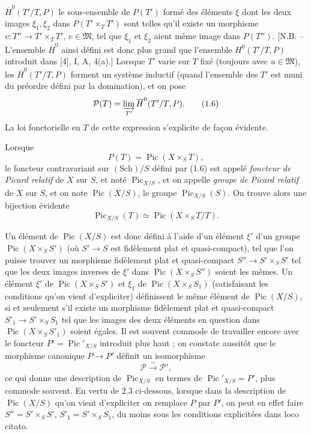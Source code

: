 $\overline H^0(T'/T,P)$ le sous-ensemble de $P(T')$ formé des éléments $\xi$
dont les deux images $\xi_1,\xi_2$ dans $P(T'\times_TT')$ sont telles qu'il
existe un morphisme $v:T''\longrightarrow T'\times_TT'$, $v\in\mathfrak M$,
tel que $\xi_1$ et $\xi_2$ aient même image dans $P(T'')$. [N.B. -- L'ensemble
$\overline H^0$ ainsi défini est donc plus grand que l'ensemble
$H^0(T'/T,P)$ introduit dans [4], I, A, 4(a).] Lorsque $T'$ varie sur $T$ fixé
(toujours avec $u\in\mathfrak M$), les $\overline H^0(T'/T,P)$ forment un
système inductif (quand l'ensemble des $T'$ est muni du préordre défini par la
domination), et on pose
\begin{equation}
\mathcal P(T)=\varinjlim_{T'}\overline H^0(T'/T,P).
\tag{1.6}
\end{equation}
La loi fonctorielle en $T$ de cette expression s'explicite de façon évidente.

Lorsque
\[
P(T)=\operatorname{Pic}(X\times_ST),
\]
le foncteur contravariant sur $(\mathrm{Sch})/S$ défini par (1.6) est appelé
\emph{foncteur de Picard relatif} de $X$ sur $S$, et noté
$\operatorname{Pic}_{X/S}$, et on appelle \emph{groupe de Picard relatif} de
$X$ sur $S$, et on note $\operatorname{Pic}(X/S)$, le groupe
$\operatorname{Pic}_{X/S}(S)$. On trouve alors une bijection évidente
\begin{equation}
\operatorname{Pic}_{X/S}(T)\simeq\operatorname{Pic}(X\times_ST/T).
\tag{1.7}
\end{equation}

Un élément de $\operatorname{Pic}(X/S)$ est donc défini à l'aide d'un élément
$\xi'$ d'un groupe $\operatorname{Pic}(X\times_SS')$ (où $S'\longrightarrow S$
est fidèlement plat et quasi-compact), tel que l'on puisse trouver un morphisme
fidèlement plat et quasi-compact $S''\longrightarrow S'\times_SS'$ tel que les
deux images inverses de $\xi'$ dans $\operatorname{Pic}(X\times_SS'')$ soient
les mêmes. Un élément $\xi'$ de $\operatorname{Pic}(X\times_SS')$ et $\xi_1$
de $\operatorname{Pic}(X\times_SS_1)$ (satisfaisant les conditions qu'on vient
d'expliciter) définissent le même élément de $\operatorname{Pic}(X/S)$, si et
seulement s'il existe un morphisme fidèlement plat et quasi-compact
$S'_1\longrightarrow S'\times_SS_1$ tel que les images des deux éléments en
question dans $\operatorname{Pic}(X\times_SS'_1)$ soient égales. Il est souvent
commode de travailler encore avec le foncteur
$P'=\operatorname{Pic}'_{X/S}$ introduit plus haut ; on constate aussitôt que
le morphisme canonique $P\longrightarrow P'$ définit un isomorphisme
\begin{equation}
\mathcal P\xrightarrow{\sim}\mathcal P',
\tag{1.8}
\end{equation}
ce qui donne une description de $\operatorname{Pic}_{X/S}$ en termes de
$\operatorname{Pic}'_{X/S}=P'$, plus commode souvent. En vertu de 2.3
ci-dessous, lorsque dans la description de $\operatorname{Pic}(X/S)$ qu'on
vient d'expliciter on remplace $P$ par $P'$, on peut en effet
faire $S''=S'\times_SS'$, $S'_1=S'\times_SS_1$, du moins sous les conditions
explicitées dans loco citato.

